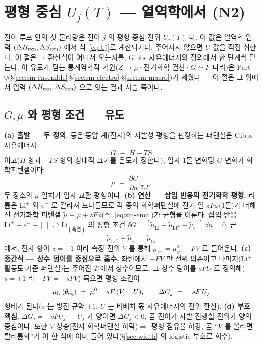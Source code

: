 \section{평형 중심 $U_j(T)$ --- 열역학에서 (N2)}\label{sec:center}
전이 루프 안의 첫 물리량은 전이 $j$ 의 평형 중심 전위 $U_j(T)$ 다. 이 값은 열역학 입력 $(\Delta H_{\mathrm{rxn}},\Delta S_{\mathrm{rxn}})$
에서 식~\eqref{eq:Uj}로 계산되거나, 주어지지 않으면 $U$ 값을 직접 취한다. 이 절은 그 환산식이 어디서 오는지를, Gibbs
자유에너지의 정의에서 한 단계씩 닫는다. 이 유도가 딛는 통계역학적 기원($Z\to\mu$·전기화학 결선·$G\simeq F$ 다리)은
Part 0(\S\ref{sec:sm-ensemble}$\cdot$\S\ref{sec:sm-electro}$\cdot$\S\ref{sec:sm-macro})가 세웠다 --- 이 절은 그 위에서 입력
$(\Delta H_{\mathrm{rxn}},\Delta S_{\mathrm{rxn}})$ 으로 잇는 결과 사슬 쪽이다.

\subsection{$G,\mu$ 와 평형 조건 --- 유도}\label{sec:center-eqcond}
\textbf{(a) 출발 --- 두 정의.} 등온$\cdot$등압 계(전지)의 자발성$\cdot$평형을 판정하는 퍼텐셜은 Gibbs 자유에너지
\begin{equation}
G\;\equiv\;H-TS
\label{eq:gibbsdef}
\end{equation}
이고($H$ 항과 $-TS$ 항의 상대적 크기를 온도가 정한다), 입자 1몰 변화당 $G$ 변화가 화학퍼텐셜이다:
\begin{equation}
\mu\;\equiv\;\frac{\partial G}{\partial n}\Big|_{T,P}.
\label{eq:mudef}
\end{equation}
두 장소의 $\mu$ 일치가 입자 교환 평형이다. \textbf{(b) 연산 --- 삽입 반응의 전기화학 평형.} 리튬은 Li$^+$ 와 $e^-$ 로
갈라져 드나들므로 각 종의 화학퍼텐셜에 전기 일 $zF\phi$(1몰)가 더해진 전기화학 퍼텐셜 $\tilde\mu\equiv\mu+zF\phi$(식~\eqref{eq:sm-emu})가 균형을
이룬다. 삽입 반응 $\mathrm{Li}^++e^-+[\,]\rightleftharpoons\mathrm{Li}_{(\text{흑연})}$ 의 평형 조건
$\delta G=[\tilde\mu_\mathrm{Li}-\tilde\mu_{\mathrm{Li}^+}-\tilde\mu_{e^-}]\,\dd n=0$, 곧
\begin{equation}
\tilde\mu_{\mathrm{Li}^+}+\tilde\mu_{e^-}=\tilde\mu_\mathrm{Li}
\label{eq:eqbalance}
\end{equation}
에서, 전자 항이 $z=-1$ 이라 측정 전위 $V$ 를 통해 $\tilde\mu_{e^-}=\mu_{e^-}^0-FV$ 로 들어온다. \textbf{(c) 중간식 ---
상수 덩이를 중심으로 흡수.} 좌변에서 $-FV$ 만 전위 의존이고 나머지(Li$^+$ 활동도$\cdot$기준 퍼텐셜)는 주어진 $T$ 에서
상수이므로, 그 상수 덩이를 $sFU$ 로 정의해($s=+1$ 라 $-FV=-sFV$) 묶으면 평형 조건이
\begin{equation}
\mu_\mathrm{Li}(\theta_{\mathrm{eq}})\;=\;\mu^0-sF\,(V-U),
\qquad \Delta G_j\;=\;-sF\,U_j
\label{eq:eqcond}
\end{equation}
형태가 된다($s$ 는 방전 규약 $+1$; $U$ 는 비배치 몫 자유에너지의 전위 환산). \textbf{(d) 부호 핵심.} $\Delta G_j=-sFU_j$ ---
$U_j$ 가 양이면 $\Delta G_j<0$, 곧 전이가 자발 진행할 전위가 양의 중심이다. 또한 $V$ 상승(전자 화학퍼텐셜 하락)$\Rightarrow$
평형 점유율 하강, 곧 ``$V$ 를 올리면 탈리튬화''가 이 한 식에 이미 들어 있다(\S\ref{sec:width} 의 logistic 부호로 회수).

